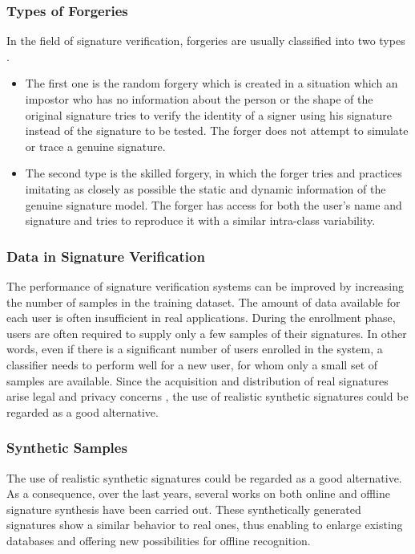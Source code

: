 \documentclass{beamer}
\begin{document}
\begin{frame}
\frametitle{Types of Forgeries}
In the field of signature verification, forgeries are usually classified into two types \parencite {impedovo2008state}. 
\begin{itemize}
\item The first one is the random forgery which is created in a situation which an impostor who has no information about the person or the shape of the original signature tries to verify the identity of a signer using his signature instead of the signature to be tested. The forger does not attempt to simulate or trace a genuine signature.

\item The second type is the skilled forgery, in which the forger tries and practices imitating as closely as possible the static and dynamic information of the genuine signature model. The forger has access for both the user’s name and signature and tries to reproduce it with a similar intra-class variability.
\end{itemize}
\end{frame}


\begin{frame}
\frametitle{Data in Signature Verification}

The performance of signature verification systems can be improved by increasing the number of samples in the training dataset. The amount of data available for each user is often insufficient in real applications. During the enrollment phase,
users are often required to supply only a few samples of their signatures. In other words, even if there is a significant number of users enrolled in the system, a classifier needs to perform well for a new user, for whom only a small set of samples are available. Since the acquisition and distribution of real signatures arise legal and privacy concerns \parencite{diaz2014generation}, the use of realistic synthetic signatures could be
regarded as a good alternative. 

\end{frame}


\begin{frame}
\frametitle{Synthetic Samples}

The use of realistic synthetic signatures could be regarded as a good alternative. As a consequence, over the last years, several works on both online \parencite{galbally2009synthetic, galbally2012synthetic} and offline \parencite{ferrer2013synthetic, ferrer2013realistic} signature synthesis have been carried out. These synthetically generated signatures show a similar behavior to real ones, thus enabling to enlarge existing databases and offering new possibilities for offline recognition.

\end{frame}
\end{document}
